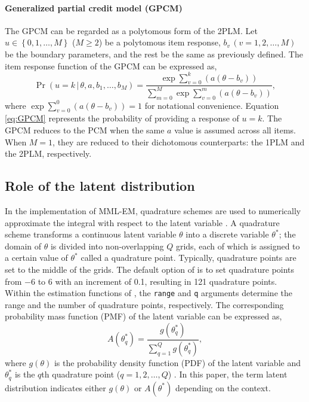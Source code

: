 \hypertarget{generalized-partial-credit-model-gpcm}{%
\paragraph{Generalized partial credit model (GPCM)}\label{generalized-partial-credit-model-gpcm}}

The GPCM can be regarded as a polytomous form of the 2PLM. Let
\(u \in \left\{0, 1, \dots, M\right\}\) (\(M \ge 2\)) be a polytomous item
response, \(b_v \, (v = 1, 2, \dots, M)\) be the boundary parameters, and
the rest be the same as previously defined. The item response function
of the GPCM can be expressed as,
\begin{equation}
\Pr( u = k \, | \, \theta, a, b_1, \dots , b_M)  =
\frac{ \exp{ \sum_{v = 0}^{k}{\left(a (\theta - b_v) \right)}} }
{ \sum_{m = 0}^{M}{\exp{ \sum_{v = 0}^{m}{\left(a (\theta - b_v) \right)}} }},
\label{eq:GPCM}
\end{equation}
where \(\exp{ \sum_{v = 0}^{0}{\left(a (\theta - b_v) \right)}} = 1\)
for notational convenience. Equation \eqref{eq:GPCM} represents the
probability of providing a response of \(u = k\). The GPCM reduces to the
PCM when the same \(a\) value is assumed across all items.
When \(M = 1\), they are reduced to their
dichotomous counterparts: the 1PLM and the 2PLM, respectively.

\hypertarget{role-of-latent-distribution}{%
\subsection{Role of the latent distribution}\label{role-of-latent-distribution}}

In the implementation of MML-EM, quadrature schemes are used to
numerically approximate the integral with respect to the latent variable
\citep{Baker+Kim:2004, Bock+Aitkin:1981}. A quadrature scheme transforms a
continuous latent variable \(\theta\) into a discrete variable
\(\theta^{*}\); the domain of \(\theta\) is divided into non-overlapping \(Q\)
grids, each of which is assigned to a certain value of \(\theta^{*}\) called a
quadrature point. Typically, quadrature points are set to the
middle of the grids. The default option of  is to set
quadrature points from \(-6\) to \(6\) with an increment of 0.1, resulting in
121 quadrature points. Within the estimation functions of ,
the \texttt{range} and \texttt{q} arguments determine the range and the number of quadrature
points, respectively. The corresponding probability mass
function (PMF) of the latent variable can be expressed as,
\begin{equation}
A \left( \theta^{*}_{q} \right) =
\frac{ g \left( \theta^{*}_{q} \right) }
{ \sum_{ q = 1 }^{Q}{g \left( \theta^{*}_{q} \right)} },
\label{eq:quadrature}
\end{equation}
where \(g{ \left( \theta \right)}\) is the probability density function
(PDF) of the latent variable and \(\theta^{*}_{q}\) is the \(q\)th
quadrature point (\(q = 1, 2, \dots, Q\)) \citep{Baker+Kim:2004}. In this
paper, the term latent distribution indicates either \(g{ \left( \theta \right)}\)
or \(A{ \left( \theta^{*} \right)}\) depending on the context.

